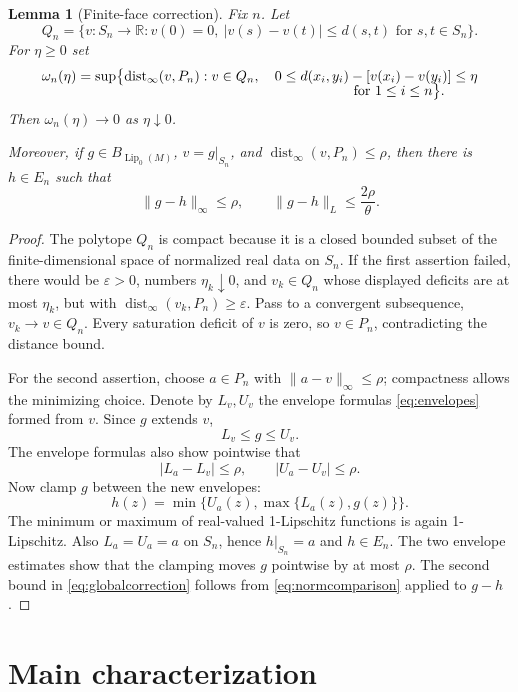 \documentclass[11pt]{article}
\newtheorem{lemma}{Lemma}
\newcommand{\Lip}{\operatorname{Lip}_0}
\newcommand{\dist}{\operatorname{dist}}
\newcommand{\R}{\mathbb R}
\begin{document}
\begin{lemma}[Finite-face correction]
Fix $n$. Let
\[
 Q_n=\{v:S_n\to\R:v(0)=0,
       \ |v(s)-v(t)|\leq d(s,t)\text{ for }s,t\in S_n\}.
\]
For $\eta\geq0$ set
\begin{align}
 \omega_n(\eta)=\sup\bigl\{\dist_\infty(v,P_n):v\in Q_n,\quad
 0\leq d(x_i,y_i)&-[v(x_i)-v(y_i)]\leq\eta\notag\\[-2mm]
 &\text{ for }1\leq i\leq n\bigr\}.
 \label{eq:omega}
\end{align}
Then $\omega_n(\eta)\to0$ as $\eta\downarrow0$.

Moreover, if $g\in B_{\Lip(M)}$, $v=g|_{S_n}$, and
$\dist_\infty(v,P_n)\leq\rho$, then there is $h\in E_n$ such that
\begin{equation}
 \|g-h\|_\infty\leq\rho,
 \qquad
 \|g-h\|_L\leq\frac{2\rho}{\theta}.
 \label{eq:globalcorrection}
\end{equation}
\end{lemma}

\begin{proof}
The polytope $Q_n$ is compact because it is a closed bounded subset of the
finite-dimensional space of normalized real data on $S_n$. If the first
assertion failed, there would be $\varepsilon>0$, numbers $\eta_k\downarrow0$,
and $v_k\in Q_n$ whose displayed deficits are at most $\eta_k$, but with
$\dist_\infty(v_k,P_n)\geq\varepsilon$. Pass to a convergent subsequence,
$v_k\to v\in Q_n$. Every saturation deficit of $v$ is zero, so $v\in P_n$,
contradicting the distance bound.

For the second assertion, choose $a\in P_n$ with
$\|a-v\|_\infty\leq\rho$; compactness allows the minimizing choice. Denote
by $L_v,U_v$ the envelope formulas \eqref{eq:envelopes} formed from $v$.
Since $g$ extends $v$,
\[
 L_v\leq g\leq U_v.
\]
The envelope formulas also show pointwise that
\[
 |L_a-L_v|\leq\rho,
 \qquad |U_a-U_v|\leq\rho.
\]
Now clamp $g$ between the new envelopes:
\begin{equation}
 h(z)=\min\{U_a(z),\max\{L_a(z),g(z)\}\}.
 \label{eq:clamp}
\end{equation}
The minimum or maximum of real-valued 1-Lipschitz functions is again
1-Lipschitz. Also $L_a=U_a=a$ on $S_n$, hence $h|_{S_n}=a$ and $h\in E_n$.
The two envelope estimates show that the clamping moves $g$ pointwise by at
most $\rho$. The second bound in \eqref{eq:globalcorrection} follows from
\eqref{eq:normcomparison} applied to $g-h$.
\end{proof}

\section{Main characterization}
\end{document}
